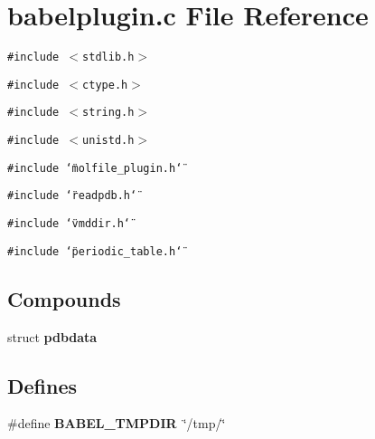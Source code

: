 \section{babelplugin.c File Reference}
\label{babelplugin_8c}
{\tt \#include $<$stdlib.h$>$}\par
{\tt \#include $<$ctype.h$>$}\par
{\tt \#include $<$string.h$>$}\par
{\tt \#include $<$unistd.h$>$}\par
{\tt \#include \char`\"{}molfile\_\-plugin.h\char`\"{}}\par
{\tt \#include \char`\"{}readpdb.h\char`\"{}}\par
{\tt \#include \char`\"{}vmddir.h\char`\"{}}\par
{\tt \#include \char`\"{}periodic\_\-table.h\char`\"{}}\par
\subsection*{Compounds}
\begin{CompactItemize}
\item 
struct {\bf pdbdata}
\end{CompactItemize}
\subsection*{Defines}
\begin{CompactItemize}
\item 
\#define {\bf BABEL\_\-TMPDIR}\ \char`\"{}/tmp/\char`\"{}
\end{CompactItemize}
